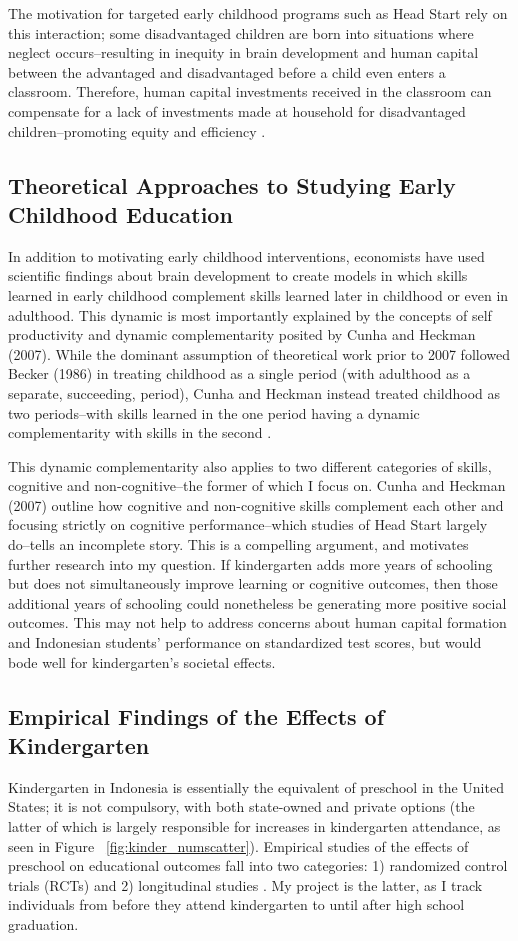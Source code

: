 The motivation for targeted early childhood programs such as Head Start rely on this interaction; some disadvantaged children are born into situations where neglect occurs--resulting in inequity in brain development and human capital between the advantaged and disadvantaged before a child even enters a classroom. Therefore, human capital investments received in the classroom can compensate for a lack of investments made at household for disadvantaged children--promoting equity and efficiency \citep{Heckman2011}. 

\subsection{Theoretical Approaches to Studying Early Childhood Education}
In addition to motivating early childhood interventions, economists have used scientific findings about brain development to create models in which skills learned in early childhood complement skills learned later in childhood or even in adulthood. This dynamic is most importantly explained by the concepts of self productivity and dynamic complementarity posited by Cunha and Heckman (2007). While the dominant assumption of theoretical work prior to 2007 followed Becker (1986) in treating childhood as a single period (with adulthood as a separate, succeeding, period), Cunha and Heckman instead treated childhood as two periods--with skills learned in the one period having a dynamic complementarity with skills in the second \citep{Becker1986,Cunha2007}.

This dynamic complementarity also applies to two different categories of skills, cognitive and non-cognitive--the former of which I focus on. Cunha and Heckman (2007) outline how cognitive and non-cognitive skills complement each other and focusing strictly on cognitive performance--which studies of Head Start largely do--tells an incomplete story. This is a compelling argument, and motivates further research into my question. If kindergarten adds more years of schooling but does not simultaneously improve learning or cognitive outcomes, then those additional years of schooling could nonetheless be generating more positive social outcomes. This may not help to address concerns about human capital formation and Indonesian students' performance on standardized test scores, but would bode well for kindergarten's societal effects.

\subsection{Empirical Findings of the Effects of Kindergarten}
Kindergarten in Indonesia is essentially the equivalent of preschool in the United States; it is not compulsory, with both state-owned and private options (the latter of which is largely responsible for increases in kindergarten attendance, as seen in Figure ~\ref{fig:kinder_numscatter}). Empirical studies of the effects of preschool on educational outcomes fall into two categories: 1) randomized control trials (RCTs) and 2) longitudinal studies \citep{Duncan2013}. My project is the latter, as I track individuals from before they attend kindergarten to until after high school graduation.

